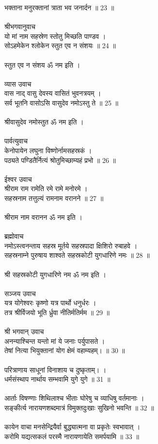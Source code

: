 भक्ताना मनुरक्तानां त्राता भव जनार्दन ॥ 23 ॥\\
\\
श्रीभगवानुवाच\\
यो मां नाम सहस्रेण स्तोतु मिच्छति पाण्डव ।\\
सोऽहमेकेन श्लोकेन स्तुत एव न संशयः ॥ 24 ॥\\
\\
स्तुत एव न संशय ॐ नम इति ।\\
\\
व्यास उवाच\\
वास नाद् वासु देवस्य वासितं भुवनत्रयम् ।\\
सर्व भूतनि वासोऽसि वासुदेव नमोऽस्तु ते ॥ 25 ॥\\
\\
श्रीवासुदेव नमोस्तुत ॐ नम इति ।\\
\\
पार्वत्युवाच\\
केनोपायेन लघुना विष्णोर्नामसहस्रकं ।\\
पठ्यते पण्डितैर्नित्यं श्रोतुमिच्छाम्यहं प्रभो ॥ 26 ॥\\
\\
ईश्वर उवाच\\
श्रीराम राम रामेति रमे रामे मनोरमे ।\\
सहस्रनाम तत्तुल्यं रामनाम वरानने ॥ 27 ॥\\
\\
श्रीराम नाम वरानन ॐ नम इति ।\\
\\
ब्रह्मोवाच \\
नमोऽस्त्वनन्ताय सहस्र मूर्तये सहस्रपादा क्षिशिरो रुबाहवे ।\\
सहस्रनाम्ने पुरुषाय शाश्वते सहस्रकोटी युगधारिणे नमः ॥ 28 ॥\\
\\
श्री सहस्रकोटी युगधारिणे नम ॐ नम इति ।\\
\\
सञ्जय उवाच\\
यत्र योगेश्वरः कृष्णो यत्र पार्थो धनुर्धरः ।\\
तत्र श्रीर्विजयो भूति र्ध्रुवा नीतिर्मतिर्मम ॥ 29 ॥\\
\\
श्री भगवान् उवाच\\
अनन्याश्चिन्त यन्तो मां  ये जनाः पर्युपासते ।\\
तेषां नित्या भियुक्तानां योग क्षेमं वहाम्यहम्। ॥ 30 ॥\\
\\
परित्राणाय साधूनां विनाशाय च दुष्कृताम्। ।\\
धर्मसंस्थाप नार्थाय सम्भवामि युगे युगे ॥ 31 ॥\\
\\
आर्ताः विषण्णाः शिथिलाश्च भीताः घोरेषु च व्याधिषु वर्तमानाः ।\\
सङ्कीर्त्य नारायणशब्दमात्रं विमुक्तदुःखाः सुखिनो भवन्ति ॥ 32 ॥\\
\\
कायेन वाचा मनसेन्द्रियैर्वा बुद्ध्यात्मना वा प्रकृतेः स्वभावात् ।\\
करोमि यद्यत्सकलं परस्मै नारायणायेति समर्पयामि ॥ 33 ॥\\
\\
